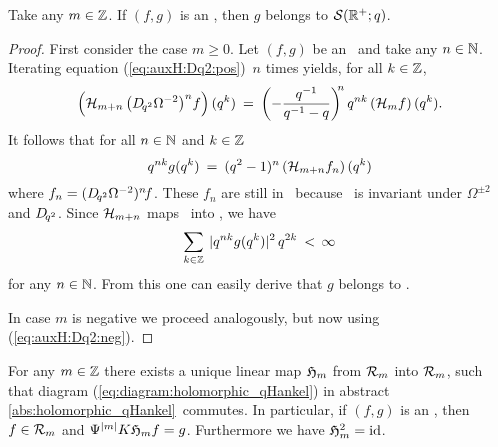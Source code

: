 \begin{lemma} \label{lemma:transform_in_schwartz_again}
Take any\/ $m\in\mathbb{Z}$. If\/ $(f,g)$ is an \Hmpair, then\/ $g$ belongs to\/ ${\mathcal S}(\mathbb{R}^+;q)$.
\end{lemma}

\begin{proof}
First consider the case $m\geq 0$.
Let $(f,g)$ be an \Hmpair\ and take any $n\in \mathbb{N}$.
Iterating equation (\ref{eq:auxH:Dq2:pos}) $\,n$ times yields, for all $k\in \mathbb{Z}$,
$$ \left({\mathcal H}_{m+n} \left(D_{\!q^2} \Omega^{-2}\right)^n \! f\right)(q^k)
      \:=\:
   \left(-\frac{q^{-1}}{q^{-1}-q}\right)^{\!\! n}  q^{nk} \left({\mathcal H}_{m}f\right)(q^k). $$
It follows that for all $n\in \mathbb{N}$ and $k\in \mathbb{Z}$
$$ q^{nk} g(q^k) \:=\: (q^2-1)^n \left({\mathcal H}_{m+n} f_n\right)(q^k) $$
where $f_n=(D_{\!q^2} \Omega^{-2})^n \! f$.
These $f_n$ are still in \Swqbis\ because \Swqbis\ is invariant under
$\Omega^{\pm 2}$ and $D_{\!q^2}$.
Since ${\mathcal H}_{m+n}$ maps \Swqbis\ into \Ltwoq, we have
$$ \sum_{k\in\mathbb{Z}} \: |q^{nk}g(q^k)|^2\, q^{2k} \:<\, \infty $$
for any $n\in \mathbb{N}$.
From this one can easily derive that $g$ belongs to \Swq\@.

In case $m$ is negative we proceed analogously, but now using (\ref{eq:auxH:Dq2:neg}).
\end{proof}



\begin{prop} \label{prop:exist:holomorphic_qHankel}
For any\/ $m\in\mathbb{Z}$ there exists a unique linear map\/ $\mathfrak{H}_{m}$ from\/
${\mathcal R}_{m}$ into\/ ${\mathcal R}_{m}$, such that diagram (\ref{eq:diagram:holomorphic_qHankel})
in abstract \ref{abs:holomorphic_qHankel}\ commutes.
In particular, if\/ $(f,g)$ is an \Hmpair, then\/ $f\in{\mathcal R}_{m}$ and\/
$\Psi^{|m|} K \mathfrak{H}_{m}f =g$. Furthermore we have\/ $\mathfrak{H}_{m}^2=\mbox{\rm id}$.
\end{prop}


